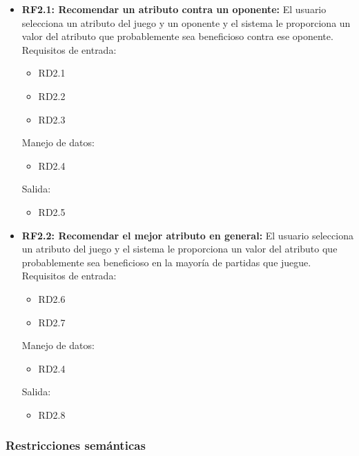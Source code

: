 	\begin{itemize}
		\item \textbf{RF2.1: Recomendar un atributo contra un oponente:} 
			El usuario selecciona un atributo del juego y un oponente y el
			sistema le proporciona un valor del atributo que probablemente
			sea beneficioso contra ese oponente.\\

		Requisitos de entrada:
		\begin{itemize}
			\item RD2.1 %
			\item RD2.2 %
			\item RD2.3 %
		\end{itemize}
		Manejo de datos:
		\begin{itemize}
			\item RD2.4 %
		\end{itemize}
		Salida:
		\begin{itemize}
			\item RD2.5 %
		\end{itemize}

		\item \textbf{RF2.2: Recomendar el mejor atributo en general:}
			El usuario selecciona un atributo del juego y el sistema le
			proporciona un valor del atributo que probablemente sea
			beneficioso en la mayoría de partidas que juegue.\\

		Requisitos de entrada:
		\begin{itemize}
			\item RD2.6 %
			\item RD2.7 %
		\end{itemize}
		Manejo de datos:
		\begin{itemize}
			\item RD2.4 %
		\end{itemize}
		Salida:
		\begin{itemize}
			\item RD2.8 %
		\end{itemize}

	\end{itemize}


\subsubsection{Restricciones semánticas}
